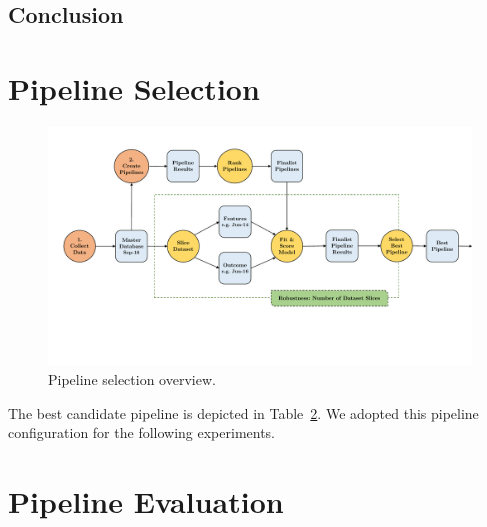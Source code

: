 \documentclass[../thesis/thesis.tex]{subfiles}
\begin{document}
\subsection{Conclusion}


\section{Pipeline Selection}


\begin{figure}[!htb]
    \centering
    \includegraphics[width=\textwidth]{../figures/design/pipeline_selection}
    \caption{Pipeline selection overview.}
    \label{fig:design:pipeline_selection}
\end{figure}



The best candidate pipeline is depicted in Table~\ref{}. We adopted this pipeline configuration for the following experiments.


\section{Pipeline Evaluation}

\end{document}
